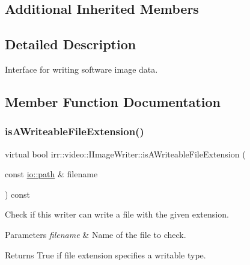 \subsection*{Additional Inherited Members}


\subsection{Detailed Description}
Interface for writing software image data. 

\subsection{Member Function Documentation}
\mbox{\label{classirr_1_1video_1_1IImageWriter_a776f8a7a050572f2144848a86fe6de6b}} 
\subsubsection{\texorpdfstring{is\+A\+Writeable\+File\+Extension()}{isAWriteableFileExtension()}}
{\footnotesize\ttfamily virtual bool irr\+::video\+::\+I\+Image\+Writer\+::is\+A\+Writeable\+File\+Extension (\begin{DoxyParamCaption}\item[{const \hyperlink{namespaceirr_1_1io_ab1bdc45edb3f94d8319c02bc0f840ee1}{io\+::path} \&}]{filename }\end{DoxyParamCaption}) const\hspace{0.3cm}{\ttfamily [pure virtual]}}



Check if this writer can write a file with the given extension. 


\begin{DoxyParams}{Parameters}
{\em filename} & Name of the file to check. \\
\hline
\end{DoxyParams}
\begin{DoxyReturn}{Returns}
True if file extension specifies a writable type. 
\end{DoxyReturn}
\mbox{\label{classirr_1_1video_1_1IImageWriter_a0a7f09d1f1613adfe2bfaadc60913f7e}} 

